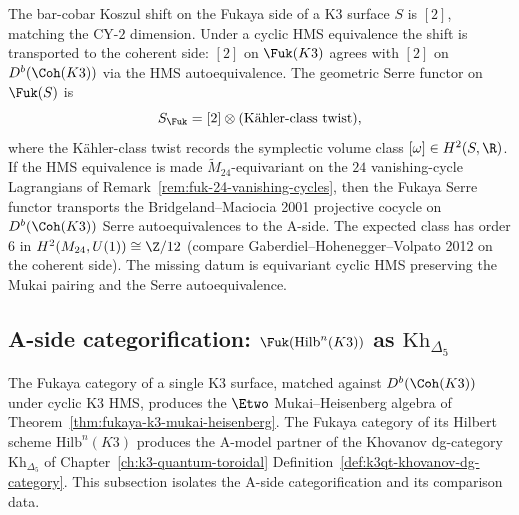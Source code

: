 \begin{remark}
\label{rem:fuk-serre-cocycle}
The bar-cobar Koszul shift on the Fukaya side of a K3 surface $S$ is
$[2]$, matching the CY-$2$ dimension. Under a cyclic HMS equivalence
the shift is transported to the coherent side: $[2]$ on $\Fuk(K3)$
agrees with $[2]$ on $D^b(\Coh(K3))$ via the HMS autoequivalence.
The geometric Serre functor on $\Fuk(S)$ is
\[
 S_{\Fuk} = [2] \otimes (\text{K\"{a}hler-class twist}),
\]
where the K\"{a}hler-class twist records the symplectic volume class
$[\omega] \in H^2(S,\R)$. If the HMS equivalence is made
$\widetilde{M}_{24}$-equivariant on the $24$ vanishing-cycle
Lagrangians of Remark~\ref{rem:fuk-24-vanishing-cycles}, then the
Fukaya Serre functor transports the Bridgeland--Maciocia 2001
projective cocycle on $D^b(\Coh(K3))$ Serre autoequivalences to the
A-side. The expected class has order $6$ in
$H^2(M_{24},U(1)) \cong \Z/12$ (compare
Gaberdiel--Hohenegger--Volpato 2012 on the coherent side). The
missing datum is equivariant cyclic HMS preserving the Mukai
pairing and the Serre autoequivalence.
\end{remark}


\subsection{A-side categorification: \texorpdfstring{$\Fuk(\mathrm{Hilb}^n(K3))$}{Fuk(Hilb-n(K3))} as
\texorpdfstring{$\mathrm{Kh}_{\Delta_5}$}{Kh-Delta-5}}
\label{subsec:fukaya-khovanov-hilb-k3}

The Fukaya category of a single K3 surface, matched against
$D^b(\Coh(K3))$ under cyclic K3 HMS, produces the $\Etwo$
Mukai--Heisenberg algebra of
Theorem~\ref{thm:fukaya-k3-mukai-heisenberg}. The Fukaya category of
its Hilbert scheme $\mathrm{Hilb}^n(K3)$ produces the A-model
partner of the Khovanov dg-category $\mathrm{Kh}_{\Delta_5}$ of
Chapter~\ref{ch:k3-quantum-toroidal}
Definition~\ref{def:k3qt-khovanov-dg-category}. This subsection
isolates the A-side categorification and its comparison data.

